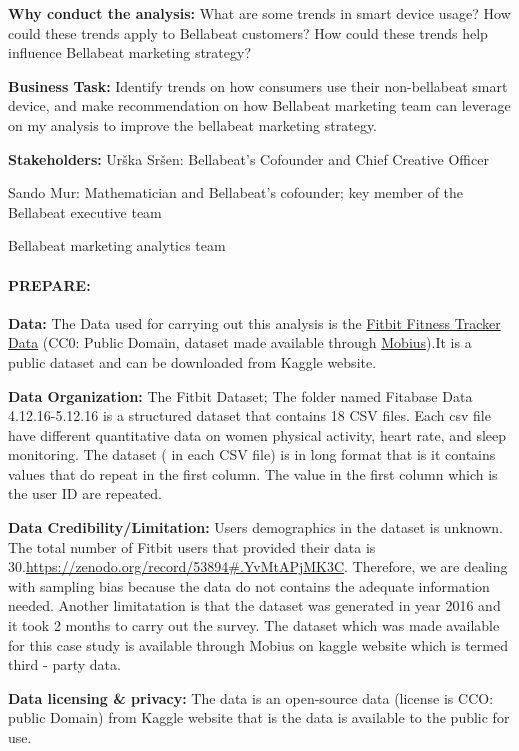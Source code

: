 \documentclass[
]{article}
\begin{document}
\textbf{Why conduct the analysis:} What are some trends in smart device
usage? How could these trends apply to Bellabeat customers? How could
these trends help influence Bellabeat marketing strategy?

\textbf{Business Task:} Identify trends on how consumers use their
non-bellabeat smart device, and make recommendation on how Bellabeat
marketing team can leverage on my analysis to improve the bellabeat
marketing strategy.

\textbf{Stakeholders:} Urška Sršen: Bellabeat's Cofounder and Chief
Creative Officer

Sando Mur: Mathematician and Bellabeat's cofounder; key member of the
Bellabeat executive team

Bellabeat marketing analytics team

\hypertarget{prepare}{%
\paragraph{\texorpdfstring{\textbf{PREPARE:}}{PREPARE:}}\label{prepare}}

\textbf{Data:} The Data used for carrying out this analysis is the
\href{https://www.kaggle.com/datasets/arashnic/fitbit}{Fitbit Fitness
Tracker Data} (CC0: Public Domain, dataset made available through
\href{https://www.kaggle.com/arashnic}{Mobius}).It is a public dataset
and can be downloaded from Kaggle website.

\textbf{Data Organization:} The Fitbit Dataset; The folder named
Fitabase Data 4.12.16-5.12.16 is a structured dataset that contains 18
CSV files. Each csv file have different quantitative data on women
physical activity, heart rate, and sleep monitoring. The dataset ( in
each CSV file) is in long format that is it contains values that do
repeat in the first column. The value in the first column which is the
user ID are repeated.

\textbf{Data Credibility/Limitation:} Users demographics in the dataset
is unknown. The total number of Fitbit users that provided their data is
30.\url{https://zenodo.org/record/53894\#.YvMtAPjMK3C}. Therefore, we
are dealing with sampling bias because the data do not contains the
adequate information needed. Another limitatation is that the dataset
was generated in year 2016 and it took 2 months to carry out the survey.
The dataset which was made available for this case study is available
through Mobius on kaggle website which is termed third - party data.

\textbf{Data licensing \& privacy:} The data is an open-source data
(license is CCO: public Domain) from Kaggle website that is the data is
available to the public for use.
\end{document}
